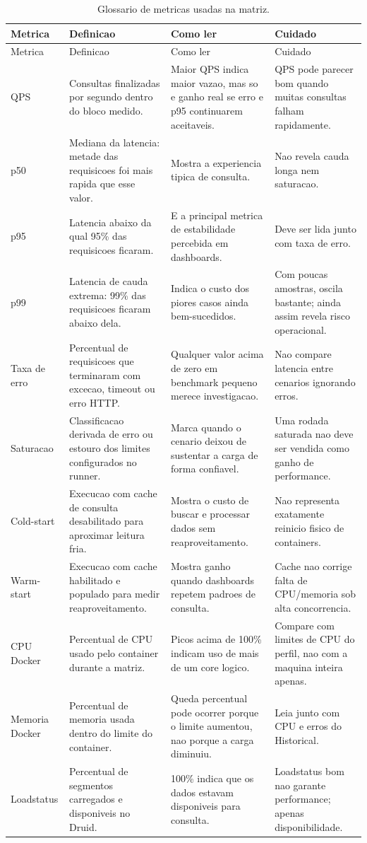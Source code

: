 {
\footnotesize
\setlength{\tabcolsep}{4pt}
\renewcommand{\arraystretch}{1.15}
\begin{longtable}{p{}p{}p{}p{}}
\caption{Glossario de metricas usadas na matriz.}\\
\toprule
Metrica & Definicao & Como ler & Cuidado \\
\midrule
\endfirsthead
\toprule
Metrica & Definicao & Como ler & Cuidado \\
\midrule
\endhead
QPS & Consultas finalizadas por segundo dentro do bloco medido. & Maior QPS indica maior vazao, mas so e ganho real se erro e p95 continuarem aceitaveis. & QPS pode parecer bom quando muitas consultas falham rapidamente. \\
p50 & Mediana da latencia: metade das requisicoes foi mais rapida que esse valor. & Mostra a experiencia tipica de consulta. & Nao revela cauda longa nem saturacao. \\
p95 & Latencia abaixo da qual 95\% das requisicoes ficaram. & E a principal metrica de estabilidade percebida em dashboards. & Deve ser lida junto com taxa de erro. \\
p99 & Latencia de cauda extrema: 99\% das requisicoes ficaram abaixo dela. & Indica o custo dos piores casos ainda bem-sucedidos. & Com poucas amostras, oscila bastante; ainda assim revela risco operacional. \\
Taxa de erro & Percentual de requisicoes que terminaram com excecao, timeout ou erro HTTP. & Qualquer valor acima de zero em benchmark pequeno merece investigacao. & Nao compare latencia entre cenarios ignorando erros. \\
Saturacao & Classificacao derivada de erro ou estouro dos limites configurados no runner. & Marca quando o cenario deixou de sustentar a carga de forma confiavel. & Uma rodada saturada nao deve ser vendida como ganho de performance. \\
Cold-start & Execucao com cache de consulta desabilitado para aproximar leitura fria. & Mostra o custo de buscar e processar dados sem reaproveitamento. & Nao representa exatamente reinicio fisico de containers. \\
Warm-start & Execucao com cache habilitado e populado para medir reaproveitamento. & Mostra ganho quando dashboards repetem padroes de consulta. & Cache nao corrige falta de CPU/memoria sob alta concorrencia. \\
CPU Docker & Percentual de CPU usado pelo container durante a matriz. & Picos acima de 100\% indicam uso de mais de um core logico. & Compare com limites de CPU do perfil, nao com a maquina inteira apenas. \\
Memoria Docker & Percentual de memoria usada dentro do limite do container. & Queda percentual pode ocorrer porque o limite aumentou, nao porque a carga diminuiu. & Leia junto com CPU e erros do Historical. \\
Loadstatus & Percentual de segmentos carregados e disponiveis no Druid. & 100\% indica que os dados estavam disponiveis para consulta. & Loadstatus bom nao garante performance; apenas disponibilidade. \\
\bottomrule
\end{longtable}
}
